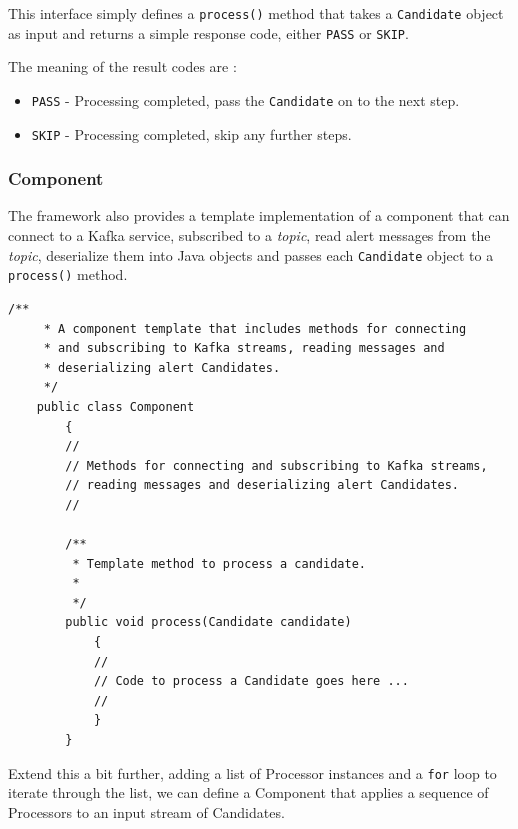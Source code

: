 \documentclass{article}
\newcommand{\kftopic} {\textit{topic}\xspace}
\newcommand{\deserz}    {deserialize\xspace}
\newcommand{\javaname}[1] {{\ttfamily\color{codeblue} #1}}
\newcommand{\javaplural}[1] {\javaname{#1}s}
\begin{document}
This interface simply defines a \texttt{process()} method that takes a \texttt{Candidate} object as input and
returns a simple response code, either \texttt{PASS} or \texttt{SKIP}.

The meaning of the result codes are :
\begin{itemize}
  \item \texttt{PASS} - Processing completed, pass the \texttt{Candidate} on to the next step.
  \item \texttt{SKIP} - Processing completed, skip any further steps.
\end{itemize}

\subsubsection{Component}
\label{java-interfaces.Component}

The framework also provides a template implementation of a component that can connect to a Kafka service, subscribed to a \kftopic, read alert messages from the \kftopic, \deserz them into Java objects and passes each \texttt{Candidate} object to a \texttt{process()} method.

\begin{lstlisting}[style=Java]
    /**
     * A component template that includes methods for connecting
     * and subscribing to Kafka streams, reading messages and
     * deserializing alert Candidates.
     */
    public class Component
        {
        //
        // Methods for connecting and subscribing to Kafka streams,
        // reading messages and deserializing alert Candidates.
        //

        /**
         * Template method to process a candidate.
         *
         */
        public void process(Candidate candidate)
            {
            //
            // Code to process a Candidate goes here ...
            //
            }
        }
\end{lstlisting}

Extend this a bit further, adding a list of \javaname{Processor} instances and a \texttt{for} loop to iterate through the list, we can define a \javaname{Component} that applies a sequence of \javaplural{Processor} to an input stream of \javaplural{Candidate}.
\end{document}
